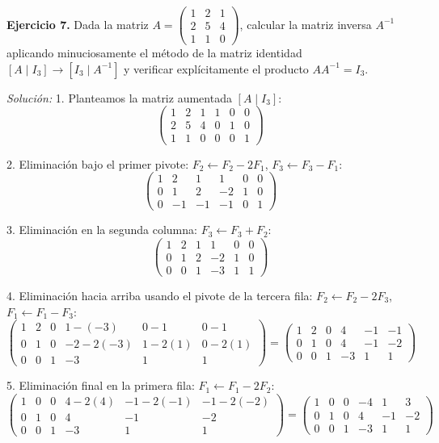 \documentclass[11pt,letterpaper]{article}
\theoremstyle{definition}
\theoremstyle{plain}
\begin{document}
\vspace{0.3cm}
\textbf{Ejercicio 7.} Dada la matriz $A = \begin{pmatrix} 1 & 2 & 1 \\ 2 & 5 & 4 \\ 1 & 1 & 0 \end{pmatrix}$, calcular la matriz inversa $A^{-1}$ aplicando minuciosamente el método de la matriz identidad $[A \mid I_3] \to [I_3 \mid A^{-1}]$ y verificar explícitamente el producto $A A^{-1} = I_3$.

\emph{Solución:}
1. Planteamos la matriz aumentada $[A \mid I_3]$:
\[
\left(\begin{array}{ccc|ccc}
1 & 2 & 1 & 1 & 0 & 0 \\
2 & 5 & 4 & 0 & 1 & 0 \\
1 & 1 & 0 & 0 & 0 & 1
\end{array}\right)
\]

2. Eliminación bajo el primer pivote: $F_2 \leftarrow F_2 - 2F_1$, $F_3 \leftarrow F_3 - F_1$:
\[
\left(\begin{array}{ccc|ccc}
1 & 2 & 1 & 1 & 0 & 0 \\
0 & 1 & 2 & -2 & 1 & 0 \\
0 & -1 & -1 & -1 & 0 & 1
\end{array}\right)
\]

3. Eliminación en la segunda columna: $F_3 \leftarrow F_3 + F_2$:
\[
\left(\begin{array}{ccc|ccc}
1 & 2 & 1 & 1 & 0 & 0 \\
0 & 1 & 2 & -2 & 1 & 0 \\
0 & 0 & 1 & -3 & 1 & 1
\end{array}\right)
\]

4. Eliminación hacia arriba usando el pivote de la tercera fila: $F_2 \leftarrow F_2 - 2F_3$, $F_1 \leftarrow F_1 - F_3$:
\[
\left(\begin{array}{ccc|ccc}
1 & 2 & 0 & 1 - (-3) & 0 - 1 & 0 - 1 \\
0 & 1 & 0 & -2 - 2(-3) & 1 - 2(1) & 0 - 2(1) \\
0 & 0 & 1 & -3 & 1 & 1
\end{array}\right) = 
\left(\begin{array}{ccc|ccc}
1 & 2 & 0 & 4 & -1 & -1 \\
0 & 1 & 0 & 4 & -1 & -2 \\
0 & 0 & 1 & -3 & 1 & 1
\end{array}\right)
\]

5. Eliminación final en la primera fila: $F_1 \leftarrow F_1 - 2F_2$:
\[
\left(\begin{array}{ccc|ccc}
1 & 0 & 0 & 4 - 2(4) & -1 - 2(-1) & -1 - 2(-2) \\
0 & 1 & 0 & 4 & -1 & -2 \\
0 & 0 & 1 & -3 & 1 & 1
\end{array}\right) = 
\left(\begin{array}{ccc|ccc}
1 & 0 & 0 & -4 & 1 & 3 \\
0 & 1 & 0 & 4 & -1 & -2 \\
0 & 0 & 1 & -3 & 1 & 1
\end{array}\right)
\]
\end{document}
